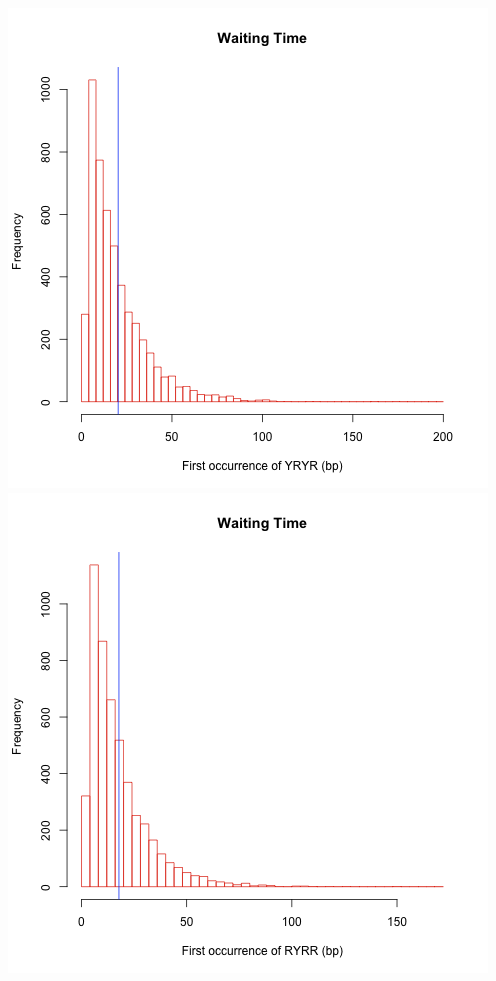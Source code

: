 \documentclass[a4paper, 10pt]{article}
\begin{document}
\begin{center}
  \includegraphics[scale=.4]{waiting-time-yryr.png}
  \includegraphics[scale=.4]{waiting-time-ryrr.png}
\end{center}
\end{document}
